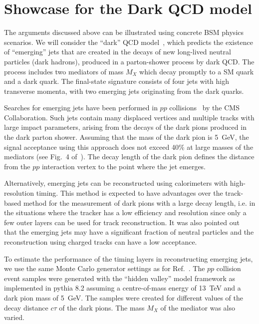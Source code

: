 \section{Showcase for the Dark QCD model}
\label{darksec}

The arguments discussed above can be illustrated using concrete BSM physics scenarios.
We will consider the ``dark'' QCD model~\cite{Bai:2013xga,Schwaller:2015gea}, which predicts 
the existence of ``emerging'' jets 
that are created in the decays of new long-lived neutral 
particles (dark hadrons), produced in a parton-shower process by dark QCD.
The process includes  two mediators of mass $M_X$ which 
decay promptly to a SM quark and a dark quark. 
The final-state signature consists of four jets with high transverse momenta, with two  
 emerging jets originating from the dark quarks.  

Searches for emerging jets have been performed in $pp$ collisions~\cite{Sirunyan:2018njd} 
by the CMS Collaboration. Such jets contain many displaced
 vertices and multiple tracks with large impact parameters, arising from the decays of the dark pions produced in the dark parton shower.
 Assuming that the mass of the dark pion is 5~GeV,  the signal acceptance using this approach does not exceed 40\% at large masses of the mediators
(see Fig.~4 of~\cite{Sirunyan:2018njd}).
The decay length of the dark pion defines the distance from the $pp$ interaction vertex 
to the point where the jet emerges. 

Alternatively, emerging jets can be reconstructed using calorimeters with high-resolution timing. This method is expected
to have advantages over the track-based method 
for the measurement of dark pions with a large decay length, i.e. in the situations where the tracker has a low
efficiency and resolution since only a few outer layers can be used for track reconstruction.
It was also pointed out~\cite{Schwaller:2015gea} that the emerging jets may have a significant fraction of neutral particles and the reconstruction
using charged tracks can have a low acceptance.

To estimate the performance of the timing layers in reconstructing emerging jets,
we use the same Monte Carlo generator settings as for Ref.~\cite{Sirunyan:2018njd}. 
The $pp$ collision event samples  were  generated with the ``hidden valley'' model framework as 
implemented in  {\sc pythia} 8.2 \cite{Sjostrand:2007gs}
assuming a centre-of-mass energy of 13~TeV and a dark pion mass of 5~GeV. 
The samples were created for different values of the decay distance $c\tau$ of the dark pions.  
The  mass $M_X$ of the mediator was also varied. 

